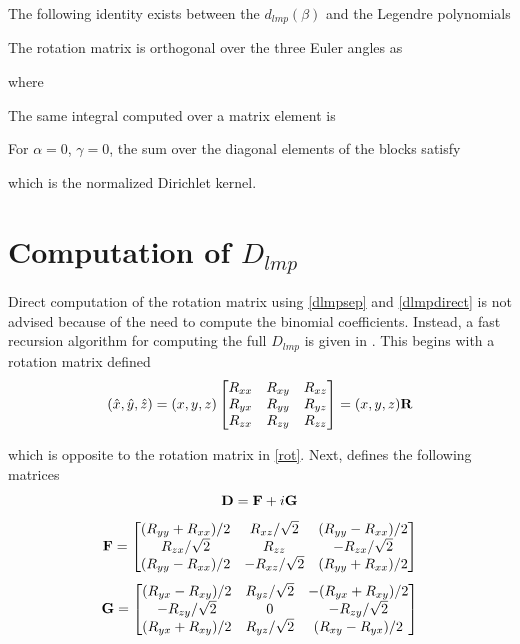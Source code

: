 The following identity exists between the $d_{lmp}(\beta)$ and the Legendre polynomials

The rotation matrix is orthogonal over the three Euler angles as

where 

The same integral computed over a matrix element is 

For $\alpha = 0$, $\gamma = 0$, the sum over the diagonal elements of the blocks satisfy

which is the normalized Dirichlet kernel.  



\clearpage
\newpage

\section{Computation of $D_{lmp}$}

Direct computation of the rotation matrix using \eqref{dlmpsep} and \eqref{dlmpdirect} is not advised because of the need to compute the binomial coefficients. Instead, a fast recursion algorithm for computing the full $D_{lmp}$ is given in \cite{choi1999rapid}. This begins with a rotation matrix defined
\begin{equation}
(\hat{x},\hat{y},\hat{z}) = (x,y,z)\begin{bmatrix} {R_{xx}} & {R_{xy}} & {R_{xz}} \\ {R_{yx}} & {R_{yy}} & {R_{yz}} \\ {R_{zx}} & {R_{zy}} & {R_{zz}} \end{bmatrix} = (x,y,z)\mathbf{R}
\end{equation}

which is opposite to the rotation matrix in \eqref{rot}. Next, \cite{choi1999rapid} defines the following matrices 
\begin{equation}
\mathbf{D} = \mathbf{F} + i\mathbf{G}
\end{equation}
\begin{equation}
\mathbf{F} = \begin{bmatrix} {(R_{yy}+R_{xx})/2} & {R_{xz}/\sqrt{2}} & {(R_{yy}-R_{xx})/2} \\ {R_{zx}/\sqrt{2}} & {R_{zz}} & {-R_{zx}/\sqrt{2}} \\ {(R_{yy}-R_{xx})/2} & {-R_{xz}/\sqrt{2}} & {(R_{yy}+R_{xx})/2} \end{bmatrix}
\end{equation}
\begin{equation}
\mathbf{G} = \begin{bmatrix} {(R_{yx}-R_{xy})/2} & {R_{yz}/\sqrt{2}} & {-(R_{yx}+R_{xy})/2} \\ {-R_{zy}/\sqrt{2}} & {0} & {-R_{zy}/\sqrt{2}} \\ {(R_{yx}+R_{xy})/2} & {R_{yz}/\sqrt{2}} & {(R_{xy}-R_{yx})/2} \end{bmatrix}
\end{equation}

